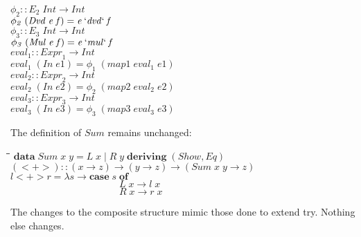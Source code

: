 \documentclass[10pt]{article}
\newlength{\lwidth}\setlength{\lwidth}{4.5cm}
\newlength{\cwidth}\setlength{\cwidth}{8mm} %
\newcommand{\Conid}[1]{\mathit{#1}}
\newcommand{\Varid}[1]{\mathit{#1}}
\begin{document}
\begin{tabbing}
${\Varid{\phi_2}\mathbin{::}\Varid{E}_2\;\Conid{Int}\to \Conid{Int}}$\\
${\Varid{\phi_2}\;(\Conid{Dvd}\;\Varid{e}\;\Varid{f})\mathrel{=}\Varid{e}\mathbin{`\Varid{dvd}`}\Varid{f}}$\\
${}$\\
${\Varid{\phi_3}\mathbin{::}\Varid{E}_3\;\Conid{Int}\to \Conid{Int}}$\\
${\Varid{\phi_3}\;(\Conid{Mul}\;\Varid{e}\;\Varid{f})\mathrel{=}\Varid{e}\mathbin{`\Varid{mul}`}\Varid{f}}$\\
${}$\\
${\Varid{eval}_1\mathbin{::}\Varid{Expr}_1\to \Conid{Int}}$\\
${\Varid{eval}_1\;(\Conid{In}\;\Varid{e1})\mathrel{=}\Varid{\phi_1}\;(\Varid{map1}\;\Varid{eval}_1\;\Varid{e1})}$\\
${}$\\
${\Varid{eval}_2\mathbin{::}\Varid{Expr}_2\to \Conid{Int}}$\\
${\Varid{eval}_2\;(\Conid{In}\;\Varid{e2})\mathrel{=}\Varid{\phi_2}\;(\Varid{map2}\;\Varid{eval}_2\;\Varid{e2})}$\\
${}$\\
${\Varid{eval}_3\mathbin{::}\Varid{Expr}_3\to \Conid{Int}}$\\
${\Varid{eval}_3\;(\Conid{In}\;\Varid{e3})\mathrel{=}\Varid{\phi_3}\;(\Varid{map3}\;\Varid{eval}_3\;\Varid{e3})}$
\end{tabbing}
The definition of \ensuremath{\Conid{Sum}} remains unchanged:

\begin{tabbing}
\qquad\=\hspace{\lwidth}\=\hspace{\cwidth}\=\+\kill
${\mathbf{data}\;\Conid{Sum}\;\Varid{x}\;\Varid{y}\mathrel{=}\Conid{L}\;\Varid{x}\mid \Conid{R}\;\Varid{y}\;\mathbf{deriving}\;(\Conid{Show},\Conid{Eq})}$\\
${}$\\
${(\mathbin{<+>})\mathbin{::}(\Varid{x}\to \Varid{z})\to (\Varid{y}\to \Varid{z})\to (\Conid{Sum}\;\Varid{x}\;\Varid{y}\to \Varid{z})}$\\
${\Varid{l}\mathbin{<+>}\Varid{r}\mathrel{=}\lambda \Varid{s}\to \mathbf{case}\;\Varid{s}\;\mathbf{of}}$\\
${\phantom{\Varid{l}\mathbin{<+>}\Varid{r}\mathrel{=}\lambda \Varid{s}\to \mathbf{case}\;\Varid{s}\;\mbox{}}\Conid{L}\;\Varid{x}\to \Varid{l}\;\Varid{x}}$\\
${\phantom{\Varid{l}\mathbin{<+>}\Varid{r}\mathrel{=}\lambda \Varid{s}\to \mathbf{case}\;\Varid{s}\;\mbox{}}\Conid{R}\;\Varid{x}\to \Varid{r}\;\Varid{x}}$
\end{tabbing}
The changes to the composite structure mimic those done to extend try.
Nothing else changes.
\end{document}
